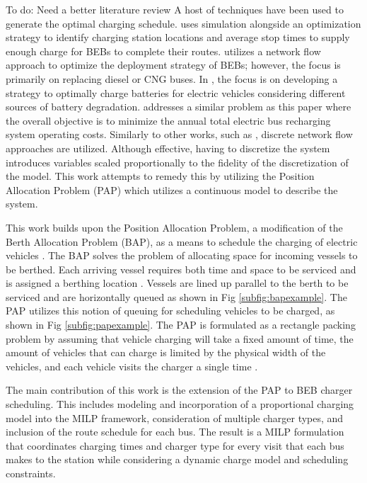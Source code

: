 \documentclass[letterpaper, 10pt, conference]{IEEEtran}
\newcommand{\TODO}[1]{{\color{green} To do: #1}}                                %
\begin{document}
\TODO{Need a better literature review} A host of techniques have been used to generate the optimal charging
schedule. \cite{Sebastiani2016} uses simulation alongside an optimization strategy to identify charging station locations and
average stop times to supply enough charge for BEBs to complete their routes. \cite{Wei2018} utilizes a network flow
approach to optimize the deployment strategy of BEBs; however, the focus is primarily on replacing diesel or CNG buses.
In \cite{Hoke2014}, the focus is on developing a strategy to optimally charge batteries for electric vehicles
considering different sources of battery degradation. \cite{Wang2017} addresses a similar problem as this paper where the overall objective is to minimize the
annual total electric bus recharging system operating costs. Similarly to other works, such as \cite{Wei2018}, discrete
network flow approaches are utilized. Although effective, having to discretize the system introduces variables scaled
proportionally to the fidelity of the discretization of the model. This work attempts to remedy this by utilizing the
Position Allocation Problem (PAP) which utilizes a continuous model to describe the system.

This work builds upon the Position Allocation Problem, a modification of the Berth Allocation Problem (BAP), as a means to schedule the charging of electric vehicles \cite{Qarebagh2019}. The BAP solves the problem of allocating space
for incoming vessels to be berthed. Each arriving vessel requires both time and space to be serviced and is assigned a
berthing location \cite{Imai2001}. Vessels are lined up parallel to the berth to be serviced and are horizontally queued
as shown in Fig \ref{subfig:bapexample}. The PAP utilizes this notion of queuing for scheduling vehicles
to be charged, as shown in Fig \ref{subfig:papexample}. The PAP is formulated as a rectangle packing problem by assuming that vehicle charging will take a fixed amount of time, the amount of vehicles that can charge is limited by the physical width of the vehicles, and each vehicle visits the charger a single time \cite{Qarebagh2019}.

The main contribution of this work is the extension of the PAP to BEB charger scheduling. This includes modeling and incorporation of a proportional charging model into the MILP framework, consideration of multiple charger types, and inclusion of the route schedule for each bus. The result is a MILP formulation that coordinates charging times and charger type for every visit that each bus makes to the station while considering a dynamic charge model and scheduling constraints.
\end{document}
